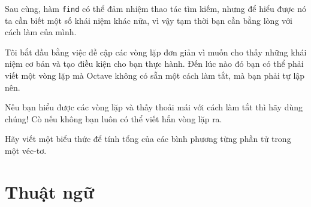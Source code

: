\documentclass[12pt]{book}
\begin{document}
Sau cùng, hàm {\tt find} có thể đảm nhiệm thao tác tìm kiếm, nhưng
để hiểu được nó ta cần biết một số khái niệm khác nữa, vì vậy tạm
thời bạn cần bằng lòng với cách làm của mình.

Tôi bắt đầu bằng việc đề cập các vòng lặp đơn giản vì muốn cho thấy
những khái niệm cơ bản và tạo điều kiện cho bạn thực hành. Đến lúc
nào đó bạn có thể phải viết một vòng lặp mà Octave không có sẵn
một cách làm tắt, mà bạn phải tự lập nên.

Nếu bạn hiểu được các vòng lặp và thấy thoải mái với cách làm tắt
thì hãy dùng chúng! Cò nếu không bạn luôn có thể viết hẳn vòng lặp
ra.

\begin{ex}
Hãy viết một biểu thức để tính tổng của các bình phương từng phần tử
trong một véc-tơ.
\end{ex}


\section{Thuật ngữ}
\end{document}

